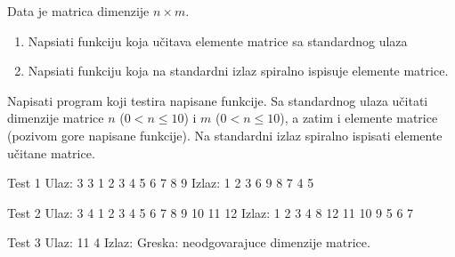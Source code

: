 \begin{Exercise}[label=325]
Data je matrica dimenzije $n \times m$.
\begin{enumerate}
\item Napsiati funkciju koja učitava elemente matrice sa standardnog ulaza
\item Napsiati funkciju koja na standardni izlaz spiralno ispisuje elemente matrice.
\end{enumerate}
Napisati program koji testira napisane funkcije. Sa standardnog
ulaza učitati dimenzije matrice $n$ ($0 < n \leq 10$) i
$m$ ($0 < n \leq 10$), a zatim i elemente matrice (pozivom gore
napisane funkcije). Na standardni izlaz spiralno ispisati elemente
učitane matrice.

\begin{miditest}
\begin{test}{Test 1}
Ulaz:  3 3
       1 2 3
       4 5 6
       7 8 9       
Izlaz: 1 2 3 6 9 8 7 4 5
\end{test}
\end{miditest}
\begin{miditest}
\begin{test}{Test 2}
Ulaz:  3 4
       1 2 3 4
       5 6 7 8
       9 10 11 12	   
Izlaz: 1 2 3 4 8 12 11 10 9 5 6 7
\end{test}
\end{miditest}

\begin{maxitest}
\begin{test}{Test 3}
Ulaz:  11 4       	   
Izlaz: Greska: neodgovarajuce dimenzije matrice.
\end{test}
\end{maxitest}
\end{Exercise}
\begin{Answer}[ref=325]
\end{Answer}

